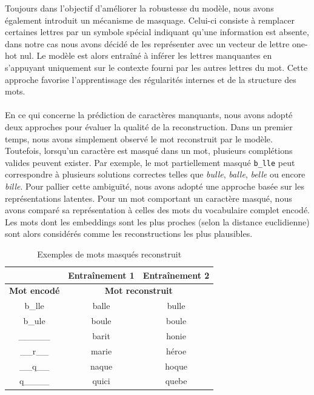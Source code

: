 \documentclass{article}
\begin{document}
Toujours dans l’objectif d’améliorer la robustesse du modèle, nous avons également introduit un mécanisme de masquage. Celui-ci consiste à remplacer certaines lettres par un symbole spécial indiquant qu’une information est absente, dans notre cas nous avons décidé de les représenter avec un vecteur de lettre one-hot nul. Le modèle est alors entraîné à inférer les lettres manquantes en s’appuyant uniquement sur le contexte fourni par les autres lettres du mot. Cette approche favorise l’apprentissage des régularités internes et de la structure des mots.
\\ \\
En ce qui concerne la prédiction de caractères manquants, nous avons adopté deux approches pour évaluer la qualité de la reconstruction. Dans un premier temps, nous avons simplement observé le mot reconstruit par le modèle. Toutefois, lorsqu’un caractère est masqué dans un mot, plusieurs complétions valides peuvent exister. Par exemple, le mot partiellement masqué \texttt{b\_lle} peut correspondre à plusieurs solutions correctes telles que \textit{bulle}, \textit{balle}, \textit{belle} ou encore \textit{bille}. Pour pallier cette ambiguïté, nous avons adopté une approche basée sur les représentations latentes. Pour un mot comportant un caractère masqué, nous avons comparé sa représentation à celles des mots du vocabulaire complet encodé. Les mots dont les embeddings sont les plus proches (selon la distance euclidienne) sont alors considérés comme les reconstructions les plus plausibles.

\begin{table}[H]
\centering
\begin{tabular}{c|cc}
\hline
& \textbf{Entraînement 1} & \textbf{Entraînement 2}\\
\hline
\textbf{Mot encodé} & \multicolumn{2}{c}{\textbf{Mot reconstruit}}  \\
\hline
b\_lle & balle & bulle \\
b\_ule & boule & boule \\
\_\_\_\_\_ & barit & honie \\
\_\_r\_\_ & marie & héroe \\
\_\_q\_\_ & naque & hoque \\
q\_\_\_\_ & quici & quebe \\
\hline
\end{tabular}
\caption{Exemples de mots masqués reconstruit}
\end{table}
\end{document}
